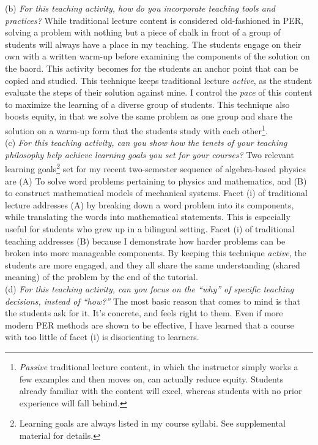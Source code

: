 \documentclass[../../../main.tex]{subfiles}
\begin{document}
(b) \textit{For this teaching activity, how do you incorporate teaching tools and practices?} While traditional lecture content is considered old-fashioned in PER, solving a problem with nothing but a piece of chalk in front of a group of students will always have a place in my teaching.  The students engage on their own with a written warm-up before examining the components of the solution on the baord.  This activity becomes for the students an anchor point that can be copied and studied.  This technique keeps traditional lecture \textit{active}, as the student evaluate the steps of their solution against mine.  I control the \textit{pace} of this content to maximize the learning of a diverse group of students.  This technique also boosts equity, in that we solve the same problem as one group and share the solution on a warm-up form that the students study with each other\footnote{\textit{Passive} traditional lecture content, in which the instructor simply works a few examples and then moves on, can actually reduce equity.  Students already familiar with the content will excel, whereas students with no prior experience will fall behind.}.
\\
\vspace{0.25cm}
(c) \textit{For this teaching activity, can you show how the tenets of your teaching philosophy help achieve learning goals you set for your courses?} Two relevant learning goals\footnote{Learning goals are always listed in my course syllabi.  See supplemental material for details.} set for my recent two-semester sequence of algebra-based physics are (A) To solve word problems pertaining to physics and mathematics, and (B) to construct mathematical models of mechanical systems.  Facet (i) of traditional lecture addresses (A) by breaking down a word problem into its components, while translating the words into mathematical statements.  This is especially useful for students who grew up in a bilingual setting.  Facet (i) of traditional teaching addresses (B) because I demonstrate how harder problems can be broken into more manageable components.  By keeping this technique \textit{active}, the students are more engaged, and they all share the same understanding (shared meaning) of the problem by the end of the tutorial.
\\
\vspace{0.25cm}
(d) \textit{For this teaching activity, can you focus on the ``why'' of specific teaching decisions, instead of ``how?''}  The most basic reason that comes to mind is that the students ask for it.  It's concrete, and feels right to them.  Even if more modern PER methods are shown to be effective, I have learned that a course with too little of facet (i) is disorienting to learners.
\end{document}

